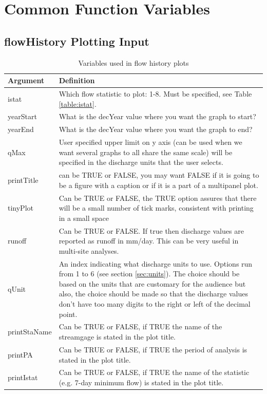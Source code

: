 \documentclass[a4paper,11pt]{article}\usepackage{graphicx, color}
\begin{document}
\newpage
\FloatBarrier
\section{Common Function Variables}
\label{sec:appendixPlot}
\subsection{flowHistory Plotting Input}
\label{sec:flowHistoryVariables}
\begin{table}[ht]
\caption{Variables used in flow history plots  \label{tab:flowHistoryVariables}}
\begin{tabularx}{\textwidth}{lX}
\hline
  \textbf{Argument} & \textbf{Definition} \\
\hline
istat & Which flow statistic to plot: 1-8.  Must be specified, see Table \ref{table:istat}. \\
yearStart\footnotemark[3] & What is the decYear value where you want the graph to start? \\
yearEnd\footnotemark[3] & What is the decYear value where you want the graph to end? \\
qMax & User specified upper limit on y axis (can be used when we want several graphs to all share the same scale) will be specified in the discharge units that the user selects. \\
printTitle & can be TRUE or FALSE, you may want FALSE if it is going to be a figure with a caption or if it is a part of a multipanel plot. \\
tinyPlot & Can be TRUE or FALSE, the TRUE option assures that there will be a small number of tick marks, consistent with printing in a small space \\
runoff & Can be TRUE or FALSE.  If true then discharge values are reported as runoff in mm/day.  This can be very useful in multi-site analyses. \\
qUnit & An index indicating what discharge units to use.  Options run from 1 to 6 (see section \ref{sec:units}).  The choice should be based on the units that are customary for the audience but also, the choice should be made so that the discharge values don't have too many digits to the right or left of the decimal point.\\
printStaName\footnotemark[4] & Can be TRUE or FALSE, if TRUE the name of the streamgage is stated in the plot title. \\
printPA\footnotemark[4] & Can be TRUE or FALSE, if TRUE the period of analysis is stated in the plot title. \\
printIstat\footnotemark[4] & Can be TRUE or FALSE, if TRUE the name of the statistic (e.g. 7-day minimum flow) is stated in the plot title. \\

\hline
\end{tabularx}

\end{table}
\end{document}
